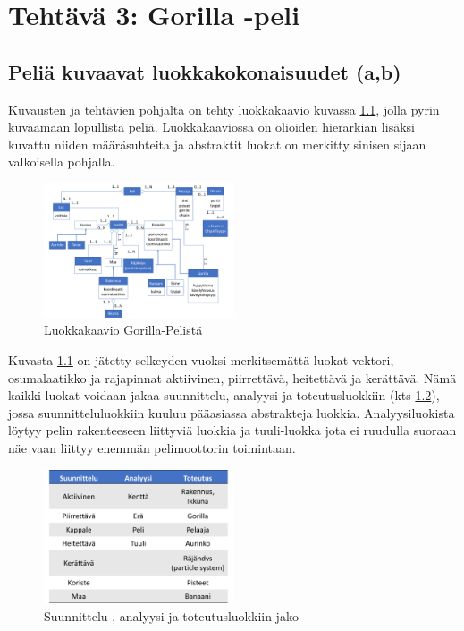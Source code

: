 \chapter{Tehtävä 3: Gorilla -peli \label{chap:Teht=0000E4v=0000E4-2}}

\section{Peliä kuvaavat luokkakokonaisuudet (a,b)}

\label{Peliä kuvaavat luokkakokonaisuudet (a,b)}

Kuvausten ja tehtävien pohjalta on tehty luokkakaavio kuvassa \ref{Gorilla},
jolla pyrin kuvaamaan lopullista peliä. Luokkakaaviossa on olioiden hierarkian
lisäksi kuvattu niiden määräsuhteita ja abstraktit luokat on merkitty sinisen
sijaan valkoisella pohjalla.

\begin{figure}
\centering \includegraphics[width=0.5\textwidth]{kuvat/GorillaPeli}
\caption{Luokkakaavio Gorilla-Pelistä}
\label{Gorilla} 
\end{figure}

Kuvasta \ref{Gorilla} on jätetty selkeyden vuoksi merkitsemättä luokat vektori,
osumalaatikko ja rajapinnat aktiivinen, piirrettävä, heitettävä ja kerättävä.
Nämä kaikki luokat voidaan jakaa suunnittelu, analyysi ja toteutusluokkiin (kts
\ref{Gorillajako}), jossa suunnitteluluokkiin kuuluu pääasiassa abstrakteja
luokkia. Analyysiluokista löytyy pelin rakenteeseen liittyviä luokkia ja
tuuli-luokka jota ei ruudulla suoraan näe vaan liittyy enemmän pelimoottorin
toimintaan.

\begin{figure}
\centering \includegraphics[width=0.5\textwidth]{kuvat/GorillaLuokat}
\caption{Suunnittelu-, analyysi ja toteutusluokkiin jako}
\label{Gorillajako} 
\end{figure}

